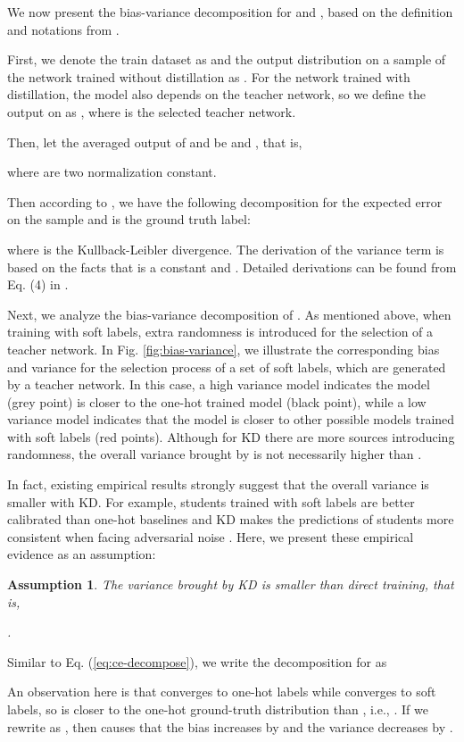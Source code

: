 \documentclass{article} \usepackage{iclr2021_conference,times}
\newtheorem{assumption}{Assumption}
\newcommand\revise[1]{#1}
\begin{document}
We now present the bias-variance decomposition for  and , based on the definition and notations from \citet{heskes1998bias}. 
\revise{
First, we denote the train dataset as  and the output distribution on a sample  of the network trained without distillation as . For the network trained with distillation, the model also depends on the teacher network, so we define the output on  as , where  is the selected teacher network. 
}
Then, let the averaged output of  and  be  and , that is,
\revise{

}
where  are two normalization constant.
\revise{
Then according to \citet{heskes1998bias}, we have the following decomposition for the expected error on the sample  and  is the ground truth label:

}
where  is the Kullback-Leibler divergence. The  derivation of the variance term is based on the facts that  is a constant and . Detailed derivations can be found from Eq. (4) in \citet{heskes1998bias}.
\revise{
Next, we analyze the bias-variance decomposition of . As mentioned above, when training with soft labels, extra randomness is introduced for the selection of a teacher network.
In Fig. \ref{fig:bias-variance}, we illustrate the corresponding bias and variance for the selection process of a set of soft labels, which are generated by a teacher network.
In this case, a high variance model indicates the model (grey point) is closer to the one-hot trained model (black point), while a low variance model indicates that the model is closer to other possible models trained with soft labels (red points). 
Although for KD there are more sources introducing randomness, the overall variance brought by  is not necessarily higher than .
}
In fact, existing empirical results strongly suggest that the overall variance is smaller with KD. For example, students trained with soft labels are better calibrated than one-hot baselines \citep{muller2019does} and KD makes the predictions of students more consistent when facing adversarial noise \citep{papernot2016distillation}. Here, we present these empirical evidence as an assumption:
\begin{assumption}
The variance brought by KD is smaller than direct training, that is, 
\revise{
.
}
\end{assumption}
Similar to Eq. (\ref{eq:ce-decompose}), we write the decomposition for  as
\revise{

An observation here is that  converges to one-hot labels while  converges to soft labels, so  is closer to the one-hot ground-truth distribution  than , i.e., . 
If we rewrite  as , then  causes that the bias increases by  and the variance decreases by .
}
\end{document}
